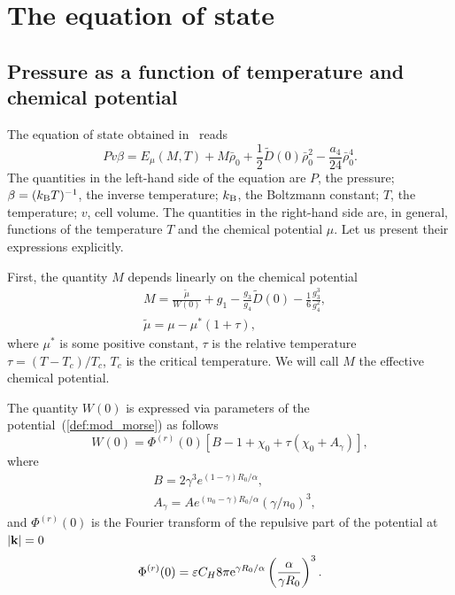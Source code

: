 \section{\label{sec:eos}The equation of state}
\subsection{Pressure as a function of temperature and chemical potential}
The equation of state obtained in~\cite[see Eq.(42)]{KozlovskiiDobush2020} reads
\begin{equation}
	\label{eq:eosMT}
	Pv\beta = E_\mu(M, T) + M \bar \rho_0 + \frac{1}{2} \tilde D(0) \bar \rho_0^2 - \frac{a_4}{24} \bar \rho_0^4.
\end{equation}
The quantities in the left-hand side of the equation are $P$, the pressure; $\beta = (k_{\rm B} T)^{-1}$, the inverse temperature; $k_{\rm B}$, the Boltzmann constant; $T$, the temperature; $v$, cell volume. The quantities in the right-hand side are, in general, functions of the temperature $T$ and the chemical potential $\mu$. Let us present their expressions explicitly.

First, the quantity $M$ depends linearly on the chemical potential
\begin{align}\label{chem_pot}
	&	M = \frac{\tilde\mu}{W(0)} + g_1 - \frac{g_3}{g_4} \tilde D(0) - \frac{1}{6} \frac{g_3^3}{g_4^2}, \\
	&	\tilde\mu=\mu-\mu^*(1+\tau),
\end{align}
where $\mu^*$ is some positive constant, $\tau$ is the relative temperature $\tau = (T - T_c) / T_c$, $T_c$ is the critical temperature. We will call $M$ the effective chemical potential.

The quantity $W(0)$ is expressed via parameters of the potential~(\ref{def:mod_morse}) as follows
\begin{equation}
	W(0) = \Phi^{(r)}(0) \left[ B - 1 + \chi_0 + \tau (\chi_0 + A_\gamma) \right],
\end{equation}
where
\begin{align*} 
	& B = 2 \gamma^3 e^{(1-\gamma)R_0/\alpha},
	\nonumber \\
	& A_\gamma = A e^{(n_0-\gamma)R_0/\alpha} \left( \gamma / n_0\right)^3, 
\end{align*}
and $\Phi^{(r)}(0)$ is the Fourier transform of the repulsive part of the potential at $\abs{\vb k}=0$
\begin{equation*}
	\Phi^{(r)}(0) = \varepsilon C_H 8\pi {\rm e}^{\gamma R_0/\alpha} \left(\frac{\alpha}{\gamma R_0}\right)^3.
\end{equation*}

